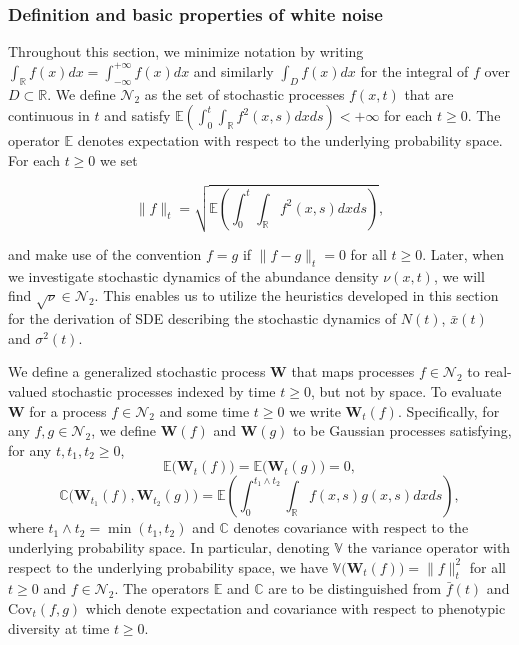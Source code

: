 \documentclass[]{article}
\begin{document}
\hypertarget{definition-and-basic-properties-of-white-noise}{%
\subsubsection{\texorpdfstring{Definition and basic properties of white
noise
\label{wnc_intro}}{Definition and basic properties of white noise }}\label{definition-and-basic-properties-of-white-noise}}

Throughout this section, we minimize notation by writing
\(\int_{\mathbb{R}}f(x)dx=\int_{-\infty}^{+\infty}f(x)dx\) and similarly
\(\int_Df(x)dx\) for the integral of \(f\) over \(D\subset\mathbb{R}\).
We define \(\mathscr{N}_2\) as the set of stochastic processes
\(f(x,t)\) that are continuous in \(t\) and satisfy
\(\mathbb{E}\left(\int_0^t\int_\mathbb{R}f^2(x,s)dxds\right)<+\infty\)
for each \(t\geq0\). The operator \(\mathbb{E}\) denotes expectation
with respect to the underlying probability space. For each \(t\geq0\) we
set

\begin{equation}
\|f\|_t=\sqrt{\mathbb{E}\left(\int_0^t\int_\mathbb{R}f^2(x,s)dxds\right)},
\end{equation}

and make use of the convention \(f=g\) if \(\|f-g\|_t=0\) for all
\(t\geq0\). Later, when we investigate stochastic dynamics of the
abundance density \(\nu(x,t)\), we will find
\(\sqrt\nu\in\mathscr{N}_2\). This enables us to utilize the heuristics
developed in this section for the derivation of SDE describing the
stochastic dynamics of \(N(t)\), \(\bar x(t)\) and \(\sigma^2(t)\).

We define a generalized stochastic process \(\mathbf W\) that maps
processes \(f\in\mathscr{N}_2\) to real-valued stochastic processes
indexed by time \(t\geq0\), but not by space. To evaluate \(\mathbf W\)
for a process \(f\in\mathscr{N}_2\) and some time \(t\geq0\) we write
\(\mathbf W_t(f)\). Specifically, for any \(f,g\in\mathscr{N}_2\), we
define \(\mathbf W(f)\) and \(\mathbf W(g)\) to be Gaussian processes
satisfying, for any \(t,t_1,t_2\geq0\), \begin{equation}\label{exp_WN}
\mathbb{E}\big(\mathbf W_t(f)\big)=\mathbb{E}\big(\mathbf W_t(g)\big)=0,
\end{equation} \begin{equation}\label{cov_WN}
\mathbb{C}\big(\mathbf W_{t_1}(f),\mathbf W_{t_2}(g)\big)=\mathbb{E}\left(\int_0^{t_1\wedge t_2}\int_\mathbb{R} f(x,s)g(x,s)dxds\right),
\end{equation} where \(t_1\wedge t_2=\min(t_1,t_2)\) and \(\mathbb{C}\)
denotes covariance with respect to the underlying probability space. In
particular, denoting \(\mathbb{V}\) the variance operator with respect
to the underlying probability space, we have
\(\mathbb{V}\big(\mathbf W_t(f)\big)=\|f\|_t^2\) for all \(t\geq0\) and
\(f\in\mathscr{N}_2\). The operators \(\mathbb{E}\) and \(\mathbb{C}\)
are to be distinguished from \(\bar f(t)\) and \(\mathrm{Cov}_t(f,g)\)
which denote expectation and covariance with respect to phenotypic
diversity at time \(t\geq0\).
\end{document}
